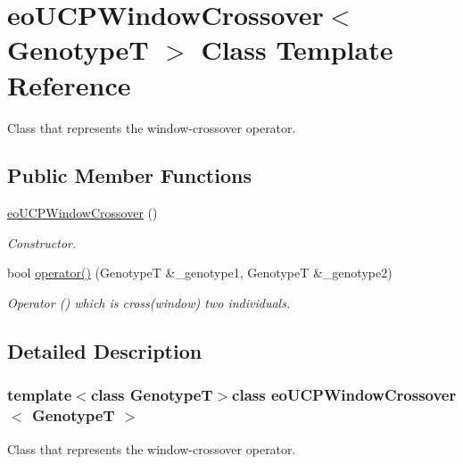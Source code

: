 \hypertarget{classeo_u_c_p_window_crossover}{\section{eo\-U\-C\-P\-Window\-Crossover$<$ \-Genotype\-T $>$ \-Class \-Template \-Reference}
\label{classeo_u_c_p_window_crossover}
}


\-Class that represents the window-\/crossover operator.  


\subsection*{\-Public \-Member \-Functions}
\begin{DoxyCompactItemize}
\item 
\hyperlink{classeo_u_c_p_window_crossover_a40fc1190fede3f767533415c04e79a2f}{eo\-U\-C\-P\-Window\-Crossover} ()
\begin{DoxyCompactList}\small\item\em \-Constructor. \end{DoxyCompactList}\item 
bool \hyperlink{classeo_u_c_p_window_crossover_aab902aad0918d0b24f9f8007b97227de}{operator()} (\-Genotype\-T \&\-\_\-genotype1, \-Genotype\-T \&\-\_\-genotype2)
\begin{DoxyCompactList}\small\item\em \-Operator () which is cross(window) two individuals. \end{DoxyCompactList}\end{DoxyCompactItemize}


\subsection{\-Detailed \-Description}
\subsubsection*{template$<$class Genotype\-T$>$class eo\-U\-C\-P\-Window\-Crossover$<$ Genotype\-T $>$}

\-Class that represents the window-\/crossover operator. 

